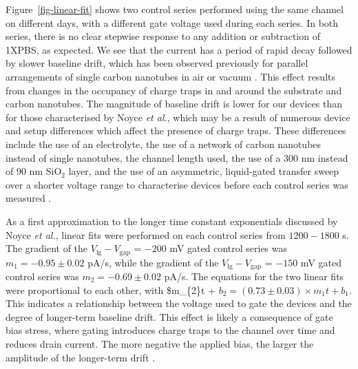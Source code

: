 \documentclass[
  a4paper,
]{scrbook}
\begin{document}
Figure~\ref{fig-linear-fit} shows two control series performed using the
same channel on different days, with a different gate voltage used
during each series. In both series, there is no clear stepwise response
to any addition or subtraction of 1XPBS, as expected. We see that the
current has a period of rapid decay followed by slower baseline drift,
which has been observed previously for parallel arrangements of single
carbon nanotubes in air or vacuum \autocite{Lin2006,Noyce2019}. This
effect results from changes in the occupancy of charge traps in and
around the substrate and carbon nanotubes. The magnitude of baseline
drift is lower for our devices than for those characterised by Noyce
\emph{et al.}, which may be a result of numerous device and setup
differences which affect the presence of charge traps. These differences
include the use of an electrolyte, the use of a network of carbon
nanotubes instead of single nanotubes, the channel length used, the use
of a 300 nm instead of 90 nm SiO\(_2\) layer, and the use of an
asymmetric, liquid-gated transfer sweep over a shorter voltage range to
characterise devices before each control series was measured
\autocite{Noyce2019}.

As a first approximation to the longer time constant exponentials
discussed by Noyce \emph{et al.}, linear fits were performed on each
control series from \(1200-1800\) s. The gradient of the
\(V_{\textrm{lg}}-V_{\textrm{gap}}\) = \(-200\) mV gated control series
was \(m_{1} = -0.95\pm0.02\) pA/s, while the gradient of the
\(V_{\textrm{lg}}-V_{\textrm{gap}}\) = \(-150\) mV gated control series
was \(m_{2} = -0.69\pm0.02\) pA/s. The equations for the two linear fits
were proportional to each other, with \$m\_\{2\}t +
\(b_{2} = (0.73 \pm 0.03)\times m_{1}t + b_{1}\). This indicates a
relationship between the voltage used to gate the devices and the degree
of longer-term baseline drift. This effect is likely a consequence of
gate bias stress, where gating introduces charge traps to the channel
over time and reduces drain current. The more negative the applied bias,
the larger the amplitude of the longer-term drift
\autocite{Bargaoui2018}.
\end{document}
